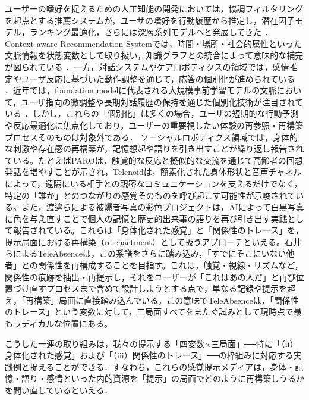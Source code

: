 \documentclass[originalpaper]{jsaiart}
\begin{document}
ユーザーの嗜好を捉えるための人工知能の開発においては，協調フィルタリングを起点とする推薦システムが，ユーザの嗜好を行動履歴から推定し，潜在因子モデル，ランキング最適化，さらには深層系列モデルへと発展してきた \cite{adomavicius2005,ricci2011,rendle2009bpr,zhang2019,quadrana2018,he2017ncf}．Context-aware Recommendation Systemでは，時間・場所・社会的属性といった文脈情報を状態変数として取り扱い，知識グラフとの統合によって意味的な補完が図られている \cite{adomavicius2011,wang2022}．一方，対話システムやケアロボティクスの領域では，感情推定やユーザ反応に基づいた動作調整を通じて，応答の個別化が進められている \cite{douglascowie2008,cowie2011,kidd2008,wada2007}．近年では，foundation modelに代表される大規模事前学習モデルの文脈において，ユーザ指向の微調整や長期対話履歴の保持を通じた個別化技術が注目されている \cite{bommasani2021,park2023generative,lee2024personalizing}．しかし，これらの「個別化」は多くの場合，ユーザの短期的な行動予測や反応最適化に焦点化しており，ユーザーの重要視したい体験の再参照・再構築プロセスそのものは対象外である．
ソーシャルロボティクス領域では，身体的な刺激や存在感の再構築が，記憶想起や語りを引き出すことが繰り返し報告されている。たとえばPAROは，触覚的な反応と擬似的な交流を通じて高齢者の回想発話を増やすことが示され\cite{wada2007,shibata2011}，Telenoidは，簡素化された身体形状と音声チャネルによって，遠隔にいる相手との親密なコミュニケーションを支えるだけでなく，特定の「誰か」とのつながりの感覚そのものを呼び起こす可能性が示唆されている\cite{ogawa2012}。また，渡邉らによる被爆者写真の彩色プロジェクトは，AIによって白黒写真に色を与え直すことで個人の記憶と歴史的出来事の語りを再び引き出す実践として報告されている\cite{watanave2013,watanave2019}。これらは「身体化された感覚」と「関係性のトレース」を，提示局面における再構築（re-enactment）として扱うアプローチといえる。石井らによるTeleAbsenceは，この系譜をさらに踏み込み，「すでにそこにいない他者」との関係性を再構成することを目指す\cite{ishii2025teleabsence}。これは，触覚・視線・リズムなど，関係性の痕跡を抽出・再提示し，それをユーザーが「これはあの人だ」と再び位置づけ直すプロセスまで含めて設計しようとする点で，単なる記録や提示を超え，「再構築」局面に直接踏み込んでいる。この意味でTeleAbsenceは，「関係性のトレース」という変数に対して，三局面すべてをまたぐ試みとして現時点で最もラディカルな位置にある。

こうした一連の取り組みは，我々の提示する「四変数×三局面」──特に「（ii）身体化された感覚」および「（iii）関係性のトレース」──の枠組みに対応する実践例と捉えることができる．すなわち，これらの感覚提示メディアは，身体・記憶・語り・感情といった内的資源を「提示」の局面でどのように再構築しうるかを問い直しているといえる．
\end{document}
